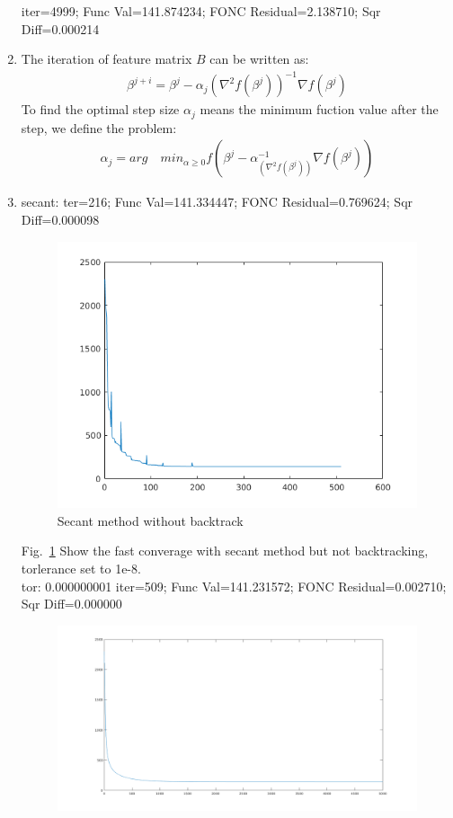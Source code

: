 \documentclass[12pt,twoside]{article}
\begin{document}
\begin{enumerate}[1)]
iter=4999; Func Val=141.874234; FONC Residual=2.138710; Sqr Diff=0.000214
\item
The iteration of feature matrix $B$ can be written as:
\begin{align}
\beta^{j+i} = \beta^j - \alpha_j (\nabla^2 f(\beta^j))^{-1} \nabla f(\beta^j)
\end{align}
To find the optimal step size $\alpha_j$ means the minimum fuction value after the step, we define the problem:
 \begin{align}
\alpha_j = arg\quad min_{\alpha\geq 0} f(\beta^j - \alpha_ (\nabla^2 f(\beta^j))^{-1} \nabla f(\beta^j))
\end{align}

\item
secant: ter=216; Func Val=141.334447; FONC Residual=0.769624; Sqr Diff=0.000098\\
\begin{figure}[tb]
\centering
\includegraphics[width = 1.0\hsize]{./figures/secant2}
\caption{Secant method without backtrack}
\label{fig:secant2 fig}
\end{figure}
Fig.~\ref{fig:secant2 fig} Show the fast converage with secant method but not backtracking, torlerance set to 1e-8.\\
tor: 0.000000001   iter=509; Func Val=141.231572; FONC Residual=0.002710; Sqr Diff=0.000000
\begin{figure}[tb]
\centering
\includegraphics[width = 1.0\hsize]{./figures/secantAndBacktrack}

\end{figure}
\end{enumerate}
\end{document}
